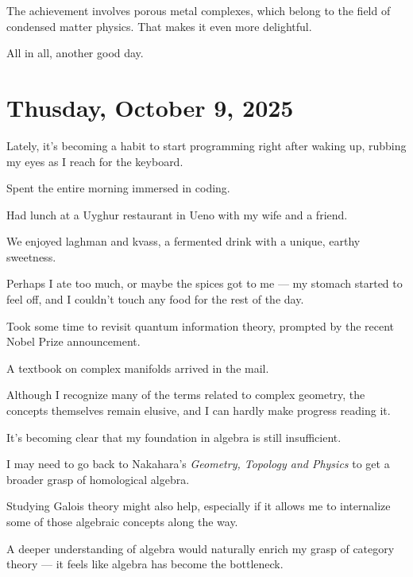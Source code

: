 \documentclass[uplatex]{jsarticle}
\begin{document}
The achievement involves porous metal complexes, which belong to the field of condensed matter physics. That makes it even more delightful.

All in all, another good day.


\section{Thusday, October 9, 2025}

Lately, it's becoming a habit to start programming right after waking up, rubbing my eyes as I reach for the keyboard.

Spent the entire morning immersed in coding.

Had lunch at a Uyghur restaurant in Ueno with my wife and a friend.

We enjoyed laghman and kvass, a fermented drink with a unique, earthy sweetness.

Perhaps I ate too much, or maybe the spices got to me — my stomach started to feel off, and I couldn’t touch any food for the rest of the day.

Took some time to revisit quantum information theory, prompted by the recent Nobel Prize announcement.

A textbook on complex manifolds arrived in the mail.

Although I recognize many of the terms related to complex geometry, the concepts themselves remain elusive, and I can hardly make progress reading it.

It’s becoming clear that my foundation in algebra is still insufficient.

I may need to go back to Nakahara’s \textit{Geometry, Topology and Physics} to get a broader grasp of homological algebra.

Studying Galois theory might also help, especially if it allows me to internalize some of those algebraic concepts along the way.

A deeper understanding of algebra would naturally enrich my grasp of category theory — it feels like algebra has become the bottleneck.
\end{document}
